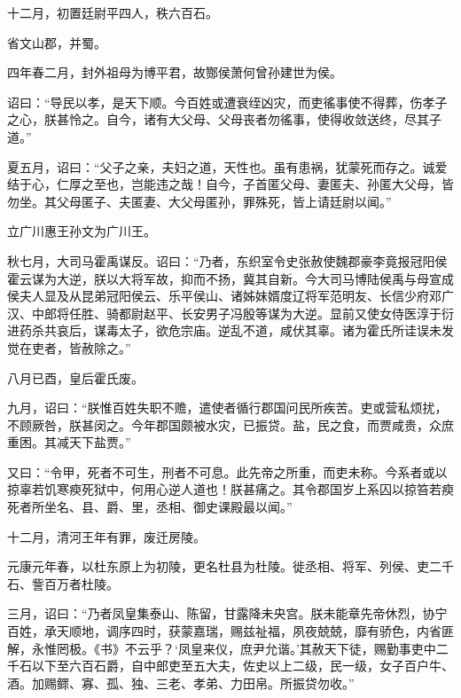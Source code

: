 \documentclass[12pt,UTF8]{ctexbook}
\begin{document}
十二月，初置廷尉平四人，秩六百石。



省文山郡，并蜀。



四年春二月，封外祖母为博平君，故酂侯萧何曾孙建世为侯。



诏曰：“导民以孝，是天下顺。今百姓或遭衰绖凶灾，而吏徭事使不得葬，伤孝子之心，朕甚怜之。自今，诸有大父母、父母丧者勿徭事，使得收敛送终，尽其子道。”



夏五月，诏曰：“父子之亲，夫妇之道，天性也。虽有患祸，犹蒙死而存之。诚爱结于心，仁厚之至也，岂能违之哉！自今，子首匿父母、妻匿夫、孙匿大父母，皆勿坐。其父母匿子、夫匿妻、大父母匿孙，罪殊死，皆上请廷尉以闻。”



立广川惠王孙文为广川王。



秋七月，大司马霍禹谋反。诏曰：“乃者，东织室令史张赦使魏郡豪李竟报冠阳侯霍云谋为大逆，朕以大将军故，抑而不扬，冀其自新。今大司马博陆侯禹与母宣成侯夫人显及从昆弟冠阳侯云、乐平侯山、诸姊妹婿度辽将军范明友、长信少府邓广汉、中郎将任胜、骑都尉赵平、长安男子冯殷等谋为大逆。显前又使女侍医淳于衍进药杀共哀后，谋毒太子，欲危宗庙。逆乱不道，咸伏其辜。诸为霍氏所诖误未发觉在吏者，皆赦除之。”



八月已酉，皇后霍氏废。



九月，诏曰：“朕惟百姓失职不赡，遣使者循行郡国问民所疾苦。吏或营私烦扰，不顾厥咎，朕甚闵之。今年郡国颇被水灾，已振贷。盐，民之食，而贾咸贵，众庶重困。其减天下盐贾。”



又曰：“令甲，死者不可生，刑者不可息。此先帝之所重，而吏未称。今系者或以掠辜若饥寒瘐死狱中，何用心逆人道也！朕甚痛之。其令郡国岁上系囚以掠笞若瘐死者所坐名、县、爵、里，丞相、御史课殿最以闻。”



十二月，清河王年有罪，废迁房陵。



元康元年春，以杜东原上为初陵，更名杜县为杜陵。徙丞相、将军、列侯、吏二千石、訾百万者杜陵。



三月，诏曰：“乃者凤皇集泰山、陈留，甘露降未央宫。朕未能章先帝休烈，协宁百姓，承天顺地，调序四时，获蒙嘉瑞，赐兹祉福，夙夜兢兢，靡有骄色，内省匪解，永惟罔极。《书》不云乎？‘凤皇来仪，庶尹允谐。’其赦天下徒，赐勤事吏中二千石以下至六百石爵，自中郎吏至五大夫，佐史以上二级，民一级，女子百户牛、酒。加赐鳏、寡、孤、独、三老、孝弟、力田帛。所振贷勿收。”
\end{document}
